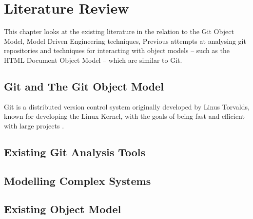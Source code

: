 \documentclass[11pt]{book}
\begin{document}
\chapter{Literature Review}
\label{litreview}
This chapter looks at the existing literature in the relation to the Git Object Model, Model Driven Engineering techniques, Previous attempts at analysing git repositories and techniques for interacting with object models -- such as the HTML Document Object Model -- which are similar to Git.

\section{Git and The Git Object Model}
Git is a distributed version control system originally developed by Linus Torvalds, known for developing the Linux Kernel, with the goals of being fast and efficient with large projects \cite{progit}.


\section{Existing Git Analysis Tools}

\section{Modelling Complex Systems}

\section{Existing Object Model}	
		
\end{document}

